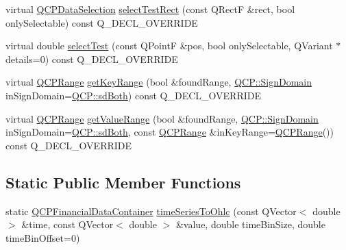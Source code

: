 \begin{DoxyCompactItemize}
\item 
virtual \hyperlink{classQCPDataSelection}{Q\+C\+P\+Data\+Selection} \hyperlink{classQCPFinancial_a3c5beb1ab028a1dba845fc9dcffc7cf4}{select\+Test\+Rect} (const Q\+RectF \&rect, bool only\+Selectable) const Q\+\_\+\+D\+E\+C\+L\+\_\+\+O\+V\+E\+R\+R\+I\+DE
\item 
virtual double \hyperlink{classQCPFinancial_aac8e91622ac58330fa9ce81cc8fd40ee}{select\+Test} (const Q\+PointF \&pos, bool only\+Selectable, Q\+Variant $\ast$details=0) const Q\+\_\+\+D\+E\+C\+L\+\_\+\+O\+V\+E\+R\+R\+I\+DE
\item 
virtual \hyperlink{classQCPRange}{Q\+C\+P\+Range} \hyperlink{classQCPFinancial_a15d68fb257113fef697356d65fa76559}{get\+Key\+Range} (bool \&found\+Range, \hyperlink{namespaceQCP_afd50e7cf431af385614987d8553ff8a9}{Q\+C\+P\+::\+Sign\+Domain} in\+Sign\+Domain=\hyperlink{namespaceQCP_afd50e7cf431af385614987d8553ff8a9aa38352ef02d51ddfa4399d9551566e24}{Q\+C\+P\+::sd\+Both}) const Q\+\_\+\+D\+E\+C\+L\+\_\+\+O\+V\+E\+R\+R\+I\+DE
\item 
virtual \hyperlink{classQCPRange}{Q\+C\+P\+Range} \hyperlink{classQCPFinancial_a82d862aa134d78853f98f8c57a03415b}{get\+Value\+Range} (bool \&found\+Range, \hyperlink{namespaceQCP_afd50e7cf431af385614987d8553ff8a9}{Q\+C\+P\+::\+Sign\+Domain} in\+Sign\+Domain=\hyperlink{namespaceQCP_afd50e7cf431af385614987d8553ff8a9aa38352ef02d51ddfa4399d9551566e24}{Q\+C\+P\+::sd\+Both}, const \hyperlink{classQCPRange}{Q\+C\+P\+Range} \&in\+Key\+Range=\hyperlink{classQCPRange}{Q\+C\+P\+Range}()) const Q\+\_\+\+D\+E\+C\+L\+\_\+\+O\+V\+E\+R\+R\+I\+DE
\end{DoxyCompactItemize}
\subsection*{Static Public Member Functions}
\begin{DoxyCompactItemize}
\item 
static \hyperlink{classQCPDataContainer}{Q\+C\+P\+Financial\+Data\+Container} \hyperlink{classQCPFinancial_a9a058c035040d3939b8884f4aaccb1a7}{time\+Series\+To\+Ohlc} (const Q\+Vector$<$ double $>$ \&time, const Q\+Vector$<$ double $>$ \&value, double time\+Bin\+Size, double time\+Bin\+Offset=0)
\end{DoxyCompactItemize}
